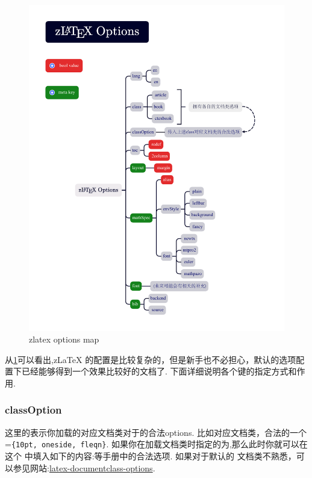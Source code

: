 \begin{figure}[!htb]
    \centering
    \includegraphics[width=.9\linewidth]{./pics/zlatex_options.pdf}
    \caption{zlatex options map}
    \label{fig:zlatex-options}
\end{figure}

从\cref{fig:zlatex-options}可以看出,z\LaTeX{} 的配置是比较复杂的，但是新手也不必担心，默认的选项配置下已经能够得到一个效果比较好的文档了.
下面详细说明各个键的指定方式和作用. 

\subsubsection{classOption}
这里的表示你加载的对应文档类对于的合法options. 比如对应文档类，合法的一个
=\texttt{\{10pt, oneside, fleqn\}}. 如果你在加载文档类时指定的为,那么此时你就可以在这个
中填入如下的内容:等手册中的合法选项. 如果对于默认的
文档类不熟悉，可以参见网站:\href{https://texblog.org/2013/02/13/latex-documentclass-options-illustrated/}{latex-documentclass-options}.

